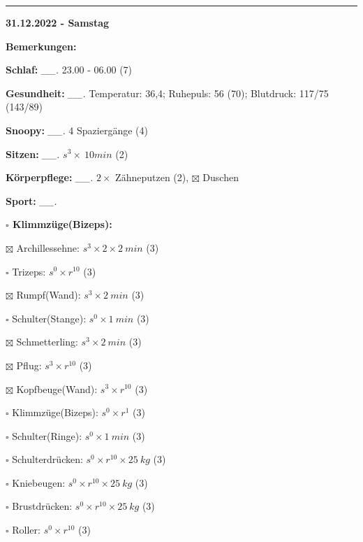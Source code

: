 \documentclass[10pt,a4paper]{article}
\newcommand\prop[1] {{\color {alizarin} {\bf #1}}}             %
\newcommand\rele[1] {{\color {english} \bf {#1}}}              %
\newcommand\mand[1] {{\color {burntorange} {\bf #1}}}          %
\newcommand\ddivide {\vskip -9pt \hrule \vskip 6pt}
\newcommand\topspace{\vskip -15pt \hskip 20pt}
\newcommand\n[1] { {\sl #1.} \hskip 5pt }
\begin{document}
\ddivide
{\rele {31.12.2022 - Samstag}}

\begin{mdframed}[style=daystyle]
  \begin{labeling}{{\mand {Bemerkungen:}}}
    \setlength\itemsep{-3pt}
  \item[{\mand {Schlaf:}}]        \n{\_\_} 23.00 - 06.00 (7)
  \item[{\mand {Gesundheit:}}]    \n{\_\_} Temperatur: 36,4; Ruhepuls: 56 (70); Blutdruck: 117/75 (143/89)
  \item[{\mand {Snoopy:}}]        \n{\_\_} 4 Spaziergänge (4)
  \item[{\mand {Sitzen:}}]        \n{\_\_} $s^3 \times\ 10 min$ (2)
  \item[{\mand {Körperpflege:}}]  \n{\_\_} $2 \times$ Zähneputzen (2), $\boxtimes$ Duschen
  \item[{\mand {Sport:}}]         \n{\_\_}
    \topspace
    \begin{minipage}{0.75\textwidth}  
      \begin{labeling}{\prop {$\square$ {Klimmzüge(Bizeps):}}}
        \setlength\itemsep{-3pt}
      \item[$\boxtimes$ Archillessehne:]    $s^3 \times 2 \times 2\ min$ (3)
      \item[$\square$ Trizeps:]           $s^0 \times r^{10}$ (3)
      \item[$\boxtimes$ Rumpf(Wand):]       $s^3 \times 2\ min$ (3)
      \item[$\square$ Schulter(Stange):]  $s^0 \times 1\ min$ (3)
      \item[$\boxtimes$ Schmetterling:]     $s^3 \times 2\ min$ (3)
      \item[$\boxtimes$ Pflug:]             $s^3 \times r^{10}$ (3)
      \item[$\boxtimes$ Kopfbeuge(Wand):]   $s^3 \times r^{10}$ (3)
      \item[$\square$ Klimmzüge(Bizeps):] $s^0 \times r^1$ (3)
      \item[$\square$ Schulter(Ringe):]   $s^0 \times 1\ min$ (3)
      \item[$\square$ Schulterdrücken:]   $s^0 \times r^{10} \times 25\ kg$ (3)
      \item[$\square$ Kniebeugen:]        $s^0 \times r^{10} \times 25\ kg$ (3)
      \item[$\square$ Brustdrücken:]      $s^0 \times r^{10} \times 25\ kg$ (3)
      \item[$\square$ Roller:]            $s^0 \times r^{10}$ (3)

\end{labeling}
\end{minipage}
\end{labeling}
\end{mdframed}
\end{document}
